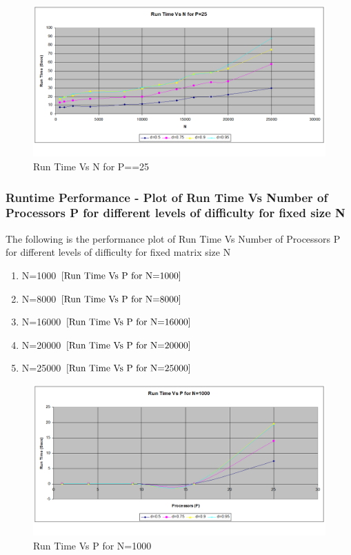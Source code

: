 \documentclass[twoside,11pt]{article}\usepackage{amsmath,amsfonts,amsthm,fullpage}
\begin{document}
\begin{figure}[!htbp]
\centering
\includegraphics[scale=.46]{charts/runtime_n_d_p_25} 
\caption{Run Time Vs N for P==25}
\label{Run Time Vs N for P==25}
\end{figure}



\pagebreak
\subsubsection{Runtime Performance - Plot of Run Time Vs Number of Processors P for different levels of difficulty for fixed size N}
The following is the performance plot of Run Time Vs Number of Processors P for different levels of difficulty for fixed matrix size N

\begin{enumerate}
\item
N=1000 $\eqref{Run Time Vs P for N=1000}$
\item
N=8000 $\eqref{Run Time Vs P for N=8000}$
\item
N=16000 $\eqref{Run Time Vs P for N=16000}$
\item
N=20000 $\eqref{Run Time Vs P for N=20000}$
\item
N=25000 $\eqref{Run Time Vs P for N=25000}$
\end{enumerate}

\begin{figure}[!htbp]
\centering
\includegraphics[scale=.46]{charts/runtime_p_d_n_1000} 
\caption{Run Time Vs P for N=1000}
\label{Run Time Vs P for N=1000}
\end{figure}
\end{document}
